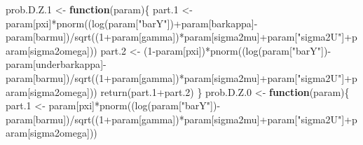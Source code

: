 \documentclass[
]{book}
\newenvironment{Shaded}{\begin{snugshade}}{\end{snugshade}}
\newcommand{\ControlFlowTok}[1]{\textcolor[rgb]{0.13,0.29,0.53}{\textbf{#1}}}
\newcommand{\DecValTok}[1]{\textcolor[rgb]{0.00,0.00,0.81}{#1}}
\newcommand{\FloatTok}[1]{\textcolor[rgb]{0.00,0.00,0.81}{#1}}
\newcommand{\FunctionTok}[1]{\textcolor[rgb]{0.00,0.00,0.00}{#1}}
\newcommand{\NormalTok}[1]{#1}
\newcommand{\OtherTok}[1]{\textcolor[rgb]{0.56,0.35,0.01}{#1}}
\newcommand{\SpecialCharTok}[1]{\textcolor[rgb]{0.00,0.00,0.00}{#1}}
\newcommand{\StringTok}[1]{\textcolor[rgb]{0.31,0.60,0.02}{#1}}
\theoremstyle{definition}
\theoremstyle{definition}
\theoremstyle{definition}
\theoremstyle{definition}
\theoremstyle{remark}
\begin{document}
\begin{Shaded}
\begin{Highlighting}[]
\NormalTok{prob.D.Z}\FloatTok{.1} \OtherTok{\textless{}{-}} \ControlFlowTok{function}\NormalTok{(param)\{}
\NormalTok{  part}\FloatTok{.1} \OtherTok{\textless{}{-}}\NormalTok{ param[}\StringTok{\textquotesingle{}pxi\textquotesingle{}}\NormalTok{]}\SpecialCharTok{*}\FunctionTok{pnorm}\NormalTok{((}\FunctionTok{log}\NormalTok{(param[}\StringTok{"barY"}\NormalTok{])}\SpecialCharTok{+}\NormalTok{param[}\StringTok{\textquotesingle{}barkappa\textquotesingle{}}\NormalTok{]}\SpecialCharTok{{-}}\NormalTok{param[}\StringTok{\textquotesingle{}barmu\textquotesingle{}}\NormalTok{])}\SpecialCharTok{/}\FunctionTok{sqrt}\NormalTok{((}\DecValTok{1}\SpecialCharTok{+}\NormalTok{param[}\StringTok{\textquotesingle{}gamma\textquotesingle{}}\NormalTok{])}\SpecialCharTok{*}\NormalTok{param[}\StringTok{\textquotesingle{}sigma2mu\textquotesingle{}}\NormalTok{]}\SpecialCharTok{+}\NormalTok{param[}\StringTok{"sigma2U"}\NormalTok{]}\SpecialCharTok{+}\NormalTok{param[}\StringTok{\textquotesingle{}sigma2omega\textquotesingle{}}\NormalTok{]))}
\NormalTok{  part}\FloatTok{.2} \OtherTok{\textless{}{-}}\NormalTok{ (}\DecValTok{1}\SpecialCharTok{{-}}\NormalTok{param[}\StringTok{\textquotesingle{}pxi\textquotesingle{}}\NormalTok{])}\SpecialCharTok{*}\FunctionTok{pnorm}\NormalTok{((}\FunctionTok{log}\NormalTok{(param[}\StringTok{"barY"}\NormalTok{])}\SpecialCharTok{{-}}\NormalTok{param[}\StringTok{\textquotesingle{}underbarkappa\textquotesingle{}}\NormalTok{]}\SpecialCharTok{{-}}\NormalTok{param[}\StringTok{\textquotesingle{}barmu\textquotesingle{}}\NormalTok{])}\SpecialCharTok{/}\FunctionTok{sqrt}\NormalTok{((}\DecValTok{1}\SpecialCharTok{+}\NormalTok{param[}\StringTok{\textquotesingle{}gamma\textquotesingle{}}\NormalTok{])}\SpecialCharTok{*}\NormalTok{param[}\StringTok{\textquotesingle{}sigma2mu\textquotesingle{}}\NormalTok{]}\SpecialCharTok{+}\NormalTok{param[}\StringTok{"sigma2U"}\NormalTok{]}\SpecialCharTok{+}\NormalTok{param[}\StringTok{\textquotesingle{}sigma2omega\textquotesingle{}}\NormalTok{]))}
  \FunctionTok{return}\NormalTok{(part}\FloatTok{.1}\SpecialCharTok{+}\NormalTok{part}\FloatTok{.2}\NormalTok{)}
\NormalTok{\}}
\NormalTok{prob.D.Z}\FloatTok{.0} \OtherTok{\textless{}{-}} \ControlFlowTok{function}\NormalTok{(param)\{}
\NormalTok{  part}\FloatTok{.1} \OtherTok{\textless{}{-}}\NormalTok{ param[}\StringTok{\textquotesingle{}pxi\textquotesingle{}}\NormalTok{]}\SpecialCharTok{*}\FunctionTok{pnorm}\NormalTok{((}\FunctionTok{log}\NormalTok{(param[}\StringTok{"barY"}\NormalTok{])}\SpecialCharTok{{-}}\NormalTok{param[}\StringTok{\textquotesingle{}barmu\textquotesingle{}}\NormalTok{])}\SpecialCharTok{/}\FunctionTok{sqrt}\NormalTok{((}\DecValTok{1}\SpecialCharTok{+}\NormalTok{param[}\StringTok{\textquotesingle{}gamma\textquotesingle{}}\NormalTok{])}\SpecialCharTok{*}\NormalTok{param[}\StringTok{\textquotesingle{}sigma2mu\textquotesingle{}}\NormalTok{]}\SpecialCharTok{+}\NormalTok{param[}\StringTok{"sigma2U"}\NormalTok{]}\SpecialCharTok{+}\NormalTok{param[}\StringTok{\textquotesingle{}sigma2omega\textquotesingle{}}\NormalTok{]))}

\end{Highlighting}
\end{Shaded}
\end{document}
